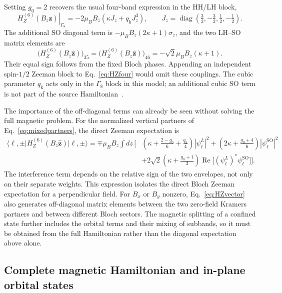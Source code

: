 \documentclass[10pt,letterpaper]{article}
\newcommand{\ket}[1]{\lvert #1\rangle}
\newcommand{\bra}[1]{\langle #1\rvert}
\newcommand{\qq}{q_{\mathrm k}}
\newcommand{\SO}{\mathrm{SO}}
\begin{document}
Setting $g_0=2$ recovers the usual four-band expression in the HH/LH block,
\begin{equation}
\left.H_Z^{(6)}(B_z\hat{\bm z})\right|_{\Gamma_8}
=-2\mu_BB_z(\kappa J_z+\qq J_z^3),
\qquad
J_z=\operatorname{diag}\left(\tfrac32,-\tfrac32,\tfrac12,-\tfrac12\right).
\label{eq:HZfour}
\end{equation}
The additional SO diagonal term is $-\mu_BB_z(2\kappa+1)\sigma_z$, and the two LH--SO matrix elements are
\begin{equation}
\bigl(H_Z^{(6)}(B_z\hat{\bm z})\bigr)_{35}=\bigl(H_Z^{(6)}(B_z\hat{\bm z})\bigr)_{46}
=-\sqrt2\mu_BB_z(\kappa+1).
\label{eq:HZmixing}
\end{equation}
Their equal sign follows from the fixed Bloch phases. Appending an independent spin-$1/2$ Zeeman block to Eq.~\eqref{eq:HZfour} would omit these couplings. The cubic parameter $\qq$ acts only in the $\Gamma_8$ block in this model; an additional cubic SO term is not part of the source Hamiltonian~\cite{delvecchio2026}.

The importance of the off-diagonal terms can already be seen without solving the full magnetic problem. For the normalized vertical partners of Eq.~\eqref{eq:mixedpartners}, the direct Zeeman expectation is
\begin{align}
\bra{\ell,\pm}H_Z^{(6)}(B_z\hat{\bm z})\ket{\ell,\pm}
=\mp\mu_BB_z\int dz\,\Bigg[&
\left(\kappa+\frac{2-g_0}{6}+\frac{\qq}{4}\right)|\psi_\ell^L|^2
+\left(2\kappa+\frac{g_0+4}{6}\right)|\psi_\ell^{\SO}|^2\nonumber\\
&+2\sqrt2\left(\kappa+\frac{g_0+1}{3}\right)
\operatorname{Re}\bigl[(\psi_\ell^L)^*\psi_\ell^{\SO}\bigr]
\Bigg].
\label{eq:directZeeman}
\end{align}
The interference term depends on the relative sign of the two envelopes, not only on their separate weights. This expression isolates the direct Bloch Zeeman expectation for a perpendicular field. For $B_x$ or $B_y$ nonzero, Eq.~\eqref{eq:HZvector} also generates off-diagonal matrix elements between the two zero-field Kramers partners and between different Bloch sectors. The magnetic splitting of a confined state further includes the orbital terms and their mixing of subbands, so it must be obtained from the full Hamiltonian rather than the diagonal expectation above alone.

\subsection{Complete magnetic Hamiltonian and in-plane orbital states}
\end{document}
